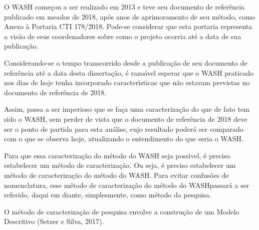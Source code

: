 \documentclass[
12pt,		%
openright,	%
twoside,  %
a4paper,			%
chapter=TITLE,		%
english,			%
french,				%
spanish,			%
brazil				%
]{USPSC-classe/USPSC_RedarTex}
\begin{document}
O WASH come\c{c}ou a ser realizado em 2013 e teve seu documento de refer\^encia publicado em meados de 2018, ap\'os anos de aprimoramento de seu m\'etodo, como Anexo \`a Portaria CTI 178/2018. Pode-se considerar que esta portaria representa a vis\~ao de seus coordenadores sobre como o projeto ocorria at\'e a data de sua publica\c{c}\~ao.










Considerando-se o tempo transcorrido desde a publica\c{c}\~ao de seu documento de refer\^encia at\'e a data desta disserta\c{c}\~ao, \'e razo\'avel esperar que o WASH praticado nos dias de hoje tenha incorporado caracter\'{\i}sticas que n\~ao estavam previstas no documento de refer\^encia de 2018.










Assim, passa a ser imperioso que se fa\c{c}a uma caracteriza\c{c}\~ao do que de fato tem sido o WASH, sem perder de vista que o documento de refer\^encia de 2018 deve ser o ponto de partida para esta an\'alise, cujo resultado poder\'a ser comparado com o que se observa hoje, atualizando o entendimento do que seria o WASH.










Para que essa caracteriza\c{c}\~ao do m\'etodo do WASH seja poss\'{\i}vel, \'e preciso estabelecer um m\'etodo de caracteriza\c{c}\~ao. Ou seja, \'e preciso estabelecer um m\'etodo de caracteriza\c{c}\~ao do m\'etodo do WASH. Para evitar confus\~oes de nomenclatura, esse \textquotedbl m\'etodo de caracteriza\c{c}\~ao do m\'etodo do WASH\textquotedbl  passar\'a a ser referido, daqui em diante, simplesmente, como \textquotedbl m\'etodo da pesquisa\textquotedbl .










O m\'etodo de caracteriza\c{c}\~ao de pesquisa envolve a constru\c{c}\~ao de um  Modelo Descritivo (Setzer e Silva, 2017).
\end{document}
